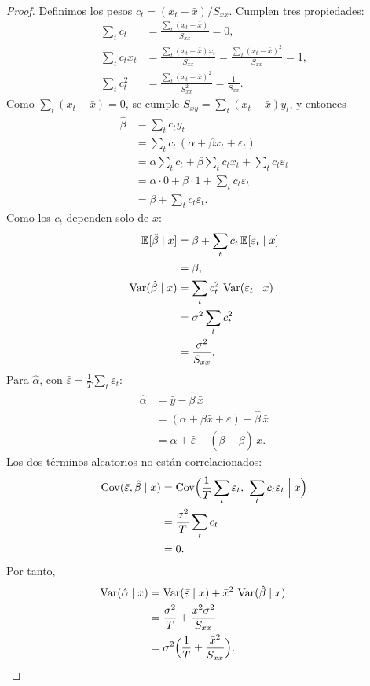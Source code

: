 \begin{proof}
Definimos los pesos $c_t=(x_t-\bar x)/S_{xx}$. Cumplen tres propiedades:
\begin{align*}
  \sum_tc_t    &= \frac{\sum_t(x_t-\bar x)}{S_{xx}} = 0,\\
  \sum_tc_tx_t &= \frac{\sum_t(x_t-\bar x)x_t}{S_{xx}} = \frac{\sum_t(x_t-\bar x)^2}{S_{xx}} = 1,\\
  \sum_tc_t^2  &= \frac{\sum_t(x_t-\bar x)^2}{S_{xx}^2} = \frac{1}{S_{xx}} .
\end{align*}
Como $\sum_t(x_t-\bar x)=0$, se cumple $S_{xy}=\sum_t(x_t-\bar x)y_t$, y entonces
\begin{align*}
  \hat\beta &= \sum_tc_ty_t\\
            &= \sum_tc_t\,(\alpha+\beta x_t+\varepsilon_t)\\
            &= \alpha\sum_tc_t+\beta\sum_tc_tx_t+\sum_tc_t\varepsilon_t\\
            &= \alpha\cdot0+\beta\cdot1+\sum_tc_t\varepsilon_t\\
            &= \beta+\sum_tc_t\varepsilon_t .
\end{align*}
Como los $c_t$ dependen solo de $x$:
\begin{align*}
  \mathbb{E}[\hat\beta\mid x] &= \beta+\sum_tc_t\,\mathbb{E}[\varepsilon_t\mid x]\\
                      &= \beta,\\
  \operatorname{Var}(\hat\beta\mid x) &= \sum_tc_t^2\,\operatorname{Var}(\varepsilon_t\mid x)\\
                        &= \sigma^2\sum_tc_t^2\\
                        &= \frac{\sigma^2}{S_{xx}} .
\end{align*}
Para $\hat\alpha$, con $\bar\varepsilon=\frac1T\sum_t\varepsilon_t$:
\begin{align*}
  \hat\alpha &= \bar y-\hat\beta\,\bar x\\
             &= (\alpha+\beta\bar x+\bar\varepsilon)-\hat\beta\,\bar x\\
             &= \alpha+\bar\varepsilon-(\hat\beta-\beta)\,\bar x .
\end{align*}
Los dos términos aleatorios no están correlacionados:
\begin{align*}
  \Cov(\bar\varepsilon,\hat\beta\mid x) &= \Cov\Bigl(\frac1T\sum_t\varepsilon_t,\ \sum_tc_t\varepsilon_t\Bigm|x\Bigr)\\
                                        &= \frac{\sigma^2}{T}\sum_tc_t\\
                                        &= 0 .
\end{align*}
Por tanto,
\begin{align*}
  \operatorname{Var}(\hat\alpha\mid x) &= \operatorname{Var}(\bar\varepsilon\mid x)+\bar x^2\,\operatorname{Var}(\hat\beta\mid x)\\
                         &= \frac{\sigma^2}{T}+\frac{\bar x^2\sigma^2}{S_{xx}}\\
                         &= \sigma^2\Bigl(\frac1T+\frac{\bar x^2}{S_{xx}}\Bigr). && \qedhere
\end{align*}
\end{proof}


